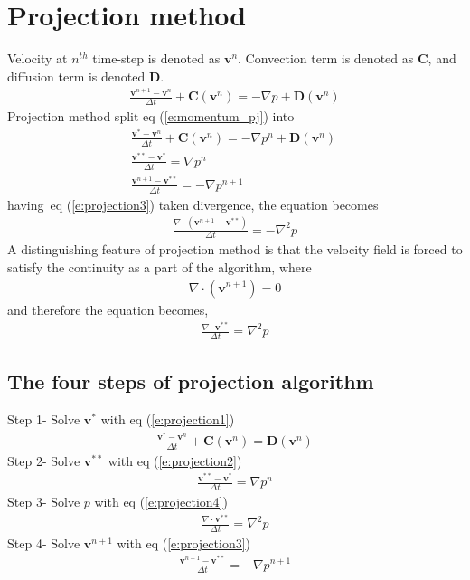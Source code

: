 \documentclass[11pt,dvips]{article}
\numberwithin{equation}{section}
\begin{document}
\section{Projection method}
Velocity at $n^{th}$ time-step is denoted as $\mathbf{v}^n$. Convection term is 
denoted as $\mathbf{C}$, and diffusion term is denoted $\mathbf{D}$.
%
\begin{align}
\frac{\mathbf{v}^{n+1}-\mathbf{v}^{n}}{\Delta t}+\mathbf{C}(\mathbf{v}^{n})=
-\nabla p+\mathbf{D}(\mathbf{v}^{{n}}) \label{e:momentum_pj} 
\end{align}
%
Projection method\cite{ferziger_cfd_2019} split eq (\ref{e:momentum_pj}) into
%
\begin{gather}
\frac{\mathbf{v}^{*}-\mathbf{v}^{n}}{\Delta t}+\mathbf{C}(\mathbf{v}^{n})=-\nabla 
p^{n}+\mathbf{D}(\mathbf{v}^{{n}}) \label{e:projection1}\ \\
\frac{\mathbf{v}^{**}-\mathbf{v}^{*}}{\Delta t}=\nabla p^n \label{e:projection2}\\
\frac{\mathbf{v}^{n+1}-\mathbf{v}^{**}}{\Delta t}=-\nabla p^{n+1}  \label{e:projection3}\
\end{gather}
%
having~eq (\ref{e:projection3}) taken divergence, the equation becomes
%
\begin{align}
\frac{\nabla \cdot(\mathbf{v}^{n+1}-\mathbf{v}^{**})}{\Delta t}=-\nabla ^2 p
\label{e:div_momentum_pj_b}
\end{align}
%
A distinguishing feature of projection method is that the velocity field is 
forced to satisfy the continuity as a part of the algorithm, where
%
\begin{align}
\nabla \cdot(\mathbf{v}^{n+1})=0 \label{e:continuity_pj}
\end{align}
%
and therefore the equation becomes, 
%
\begin{align}
\frac{\nabla \cdot \mathbf{v}^{**}}{\Delta t}=\nabla ^2 p \label{e:projection4}
\end{align}
%
\subsection{The four steps of projection algorithm}
Step 1- Solve $\mathbf{v}^{*}$ with eq (\ref{e:projection1})
%
\begin{align}
\frac{\mathbf{v}^{*}-\mathbf{v}^{n}}{\Delta t}+\mathbf{C}(\mathbf{v}^{n})=
\mathbf{D}(\mathbf{v}^{{n}})  \nonumber
\end{align}
%
Step 2- Solve $\mathbf{v}^{**}$ with eq (\ref{e:projection2})
%
\begin{align}
\frac{\mathbf{v}^{**}-\mathbf{v}^{*}}{\Delta t}=\nabla p^n \nonumber
\end{align}
%
Step 3- Solve $p$ with eq (\ref{e:projection4})
%
\begin{align}
\frac{\nabla \cdot \mathbf{v}^{**}}{\Delta t}=\nabla ^2 p \nonumber
\end{align}
%
Step 4- Solve $\mathbf{v}^{n+1}$  with eq (\ref{e:projection3})
%
\begin{align}
\frac{\mathbf{v}^{n+1}-\mathbf{v}^{**}}{\Delta t}=-\nabla p^{n+1} \nonumber
\end{align}
%
\end{document}
